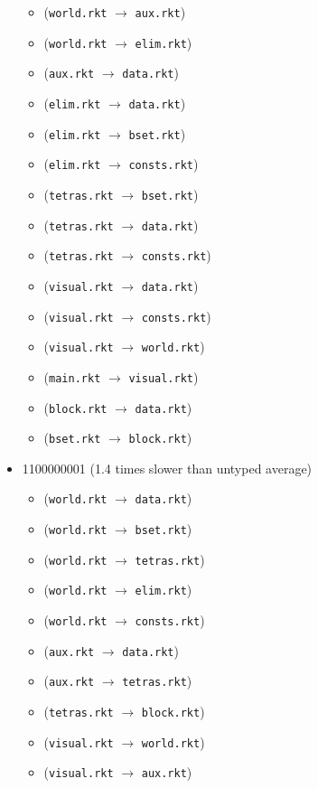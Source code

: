 \documentclass{article}
\newcommand{\mono}[1]{\texttt{#1}}
\begin{document}
\begin{itemize}
\begin{itemize}
  \item (\mono{world.rkt} $\rightarrow$ \mono{aux.rkt})
  \item (\mono{world.rkt} $\rightarrow$ \mono{elim.rkt})
  \item (\mono{aux.rkt} $\rightarrow$ \mono{data.rkt})
  \item (\mono{elim.rkt} $\rightarrow$ \mono{data.rkt})
  \item (\mono{elim.rkt} $\rightarrow$ \mono{bset.rkt})
  \item (\mono{elim.rkt} $\rightarrow$ \mono{consts.rkt})
  \item (\mono{tetras.rkt} $\rightarrow$ \mono{bset.rkt})
  \item (\mono{tetras.rkt} $\rightarrow$ \mono{data.rkt})
  \item (\mono{tetras.rkt} $\rightarrow$ \mono{consts.rkt})
  \item (\mono{visual.rkt} $\rightarrow$ \mono{data.rkt})
  \item (\mono{visual.rkt} $\rightarrow$ \mono{consts.rkt})
  \item (\mono{visual.rkt} $\rightarrow$ \mono{world.rkt})
  \item (\mono{main.rkt} $\rightarrow$ \mono{visual.rkt})
  \item (\mono{block.rkt} $\rightarrow$ \mono{data.rkt})
  \item (\mono{bset.rkt} $\rightarrow$ \mono{block.rkt})
  \end{itemize}
\item 1100000001 (1.4 times slower than untyped average)
  \begin{itemize}
  \item (\mono{world.rkt} $\rightarrow$ \mono{data.rkt})
  \item (\mono{world.rkt} $\rightarrow$ \mono{bset.rkt})
  \item (\mono{world.rkt} $\rightarrow$ \mono{tetras.rkt})
  \item (\mono{world.rkt} $\rightarrow$ \mono{elim.rkt})
  \item (\mono{world.rkt} $\rightarrow$ \mono{consts.rkt})
  \item (\mono{aux.rkt} $\rightarrow$ \mono{data.rkt})
  \item (\mono{aux.rkt} $\rightarrow$ \mono{tetras.rkt})
  \item (\mono{tetras.rkt} $\rightarrow$ \mono{block.rkt})
  \item (\mono{visual.rkt} $\rightarrow$ \mono{world.rkt})
  \item (\mono{visual.rkt} $\rightarrow$ \mono{aux.rkt})

\end{itemize}
\end{itemize}
\end{document}
